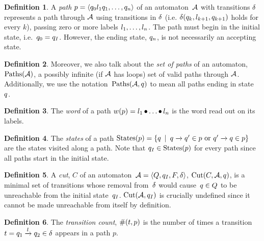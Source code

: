 \documentclass[acmsmall,review,anonymous]{acmart}\settopmatter{printfolios=true,printccs=false,printacmref=true}
\theoremstyle{definition}
\newtheorem{definition}{Definition}[section]
\begin{document}
\begin{definition}
  A \textit{path} $p = \left\langle q_0 l_1 q_1 , \ldots , q_n\right\rangle$ of an automaton~$\mathcal{A}$ with
  transitions $\delta$ represents a path through $\mathcal{A}$ using
  transitions in $\delta$ (i.e. $\delta(q_k, l_{k+1},
  q_{k+1})$ holds for every $k$), passing zero or more labels $l_1,
  \ldots, l_n$. The path must begin in the initial state, i.e.~$q_0 =
  q_I$. However, the ending state, $q_n$, is not necessarily an
  accepting state.
  \end{definition}

\begin{definition}
  Moreover, we also talk about the \textit{set of paths} of an automaton,
  $\operatorname{Paths}(\mathcal{A})$, a possibly infinite (if $\mathcal{A}$ has loops) set of
  valid paths through $\mathcal{A}$. Additionally, we use the
  notation~$\operatorname{Paths}(\mathcal{A}, q)$ to mean all paths ending in
  state~$q$.
\end{definition}

\begin{definition}
  The \textit{word} of a path $w(p) = l_1 \operatorname{\bullet} \ldots \operatorname{\bullet} l_n$ is
  the word read out on its labels.
\end{definition}

\begin{definition}
  The \textit{states} of a path $\operatorname{States}(p) = \left\{q \:\mid\:
  q \xrightarrow{} q' \in p \text{ or }
  q' \xrightarrow{} q \in p\right\}$ are the states visited along a
  path. Note that $q_I \in \operatorname{States}(p)$ for every path since all
  paths start in the initial state.
\end{definition}

\begin{definition}
  A \textit{cut}, $C$ of an automaton~$\mathcal{A} = \left\langle Q, q_I, F, \delta\right\rangle$,
  $\operatorname{Cut}(C, \mathcal{A}, q)$, is a minimal set of transitions whose
  removal from~$\delta$ would cause~$q \in Q$ to be unreachable
  from the initial state~$q_I$. $\operatorname{Cut}(\mathcal{A},
  q_I)$ is crucially undefined since it cannot be made unreachable
  from itself by definition.
\end{definition}

\begin{definition}
 The \textit{transition count}, $\operatorname{\#}(t, p)$ is the
 number of times a transition $t =
 q_1 \xrightarrow{l} q_2 \in \delta$ appears in a path
 $p$.
\end{definition}
\end{document}
